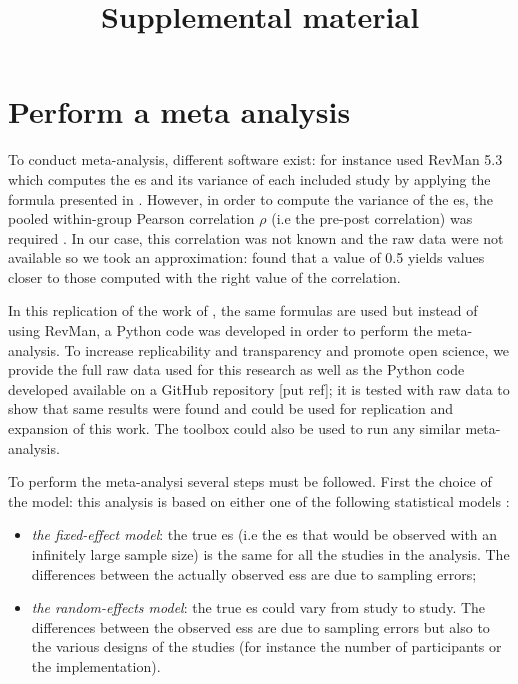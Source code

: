 \documentclass[12pt,a4paper,english]{article}
\begin{document}
\title{Supplemental material}
\date{}
\maketitle


\section{Perform a meta analysis}

To conduct meta-analysis, different software exist: for instance \citet{Cortese2016} used RevMan 5.3 \citep{RevMan} which computes the \gls{es} and its 
variance of each included study by applying the formula presented in \citet{Morris2008}. However, in order to compute the variance of the \gls{es}, 
the pooled within-group Pearson correlation $\rho$ (i.e the pre-post correlation) was required 
\citep{James2013}. In our case, this correlation was not known and the raw data were not available so we took an
 approximation: \citet{Balk2012} found that a value of 0.5 yields values closer to those computed with the right value of the correlation. 

In this replication of the work of \citeauthor{Cortese2016}, the same
formulas are used \citep{Borenstein2009} but instead of using RevMan, a Python code was developed in order to perform the meta-analysis. To increase 
replicability and transparency and promote open science, we provide the full raw data used for this research as well as the Python code 
developed available on a GitHub repository [put ref]; it is tested with \citet{Cortese2016} raw data to show that same results were found and could 
be used for replication and expansion of this work. The toolbox could also be used to run any similar meta-analysis. 

To perform the meta-analysi several steps must be followed. First the choice of the model: this analysis is based on either one of the following 
statistical models \citep{Borenstein2009}:
\begin{itemize}
    \item \textit{the fixed-effect model}: the true \gls{es} (i.e the \gls{es} that would be observed with an infinitely 
		large sample size) is the same for all the studies in the analysis. The differences between the actually observed \gls{es}s 
		are due to sampling errors;
    \item \textit{the random-effects model}: the true \gls{es} could vary from study to study. The differences between the observed
		\gls{es}s are due to sampling errors but also to the various designs of the studies (for instance the number of participants or the implementation).
\end{itemize}
\end{document}
